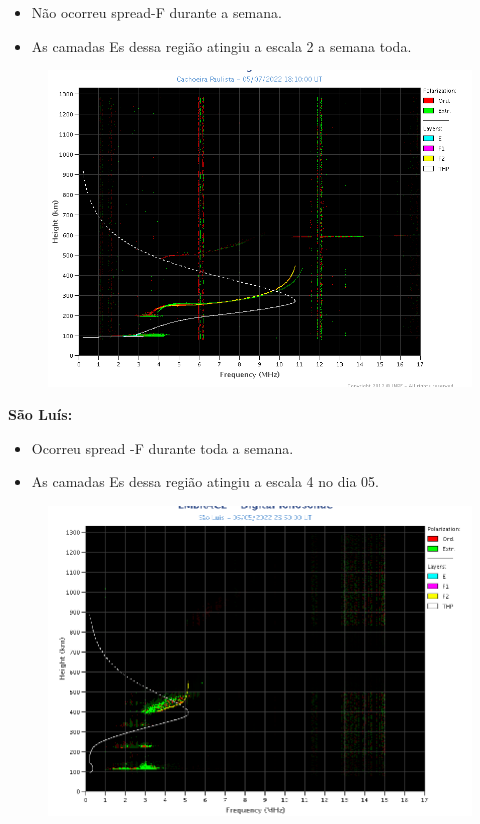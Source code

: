 \documentclass[a4paper, 10pt]{article}
\begin{document}
 \begin{itemize}
\item Não ocorreu spread-F durante a semana.
\item As camadas Es dessa região atingiu a escala 2 a semana toda. 
\end{itemize}
\begin{figure}[H]
    \centering
    \includegraphics[width=14cm]{./figures//CachoeiraPaulista.png}
\end{figure}

\textbf{São Luís: }

 \begin{itemize}
\item Ocorreu spread -F durante toda a semana. 
\item As camadas Es dessa região atingiu a escala 4 no dia 05. 
\end{itemize}
\begin{figure}[H]
    \centering
    \includegraphics[width=14cm]{./figures//SãoLuís.png}
\end{figure}
\end{document}
